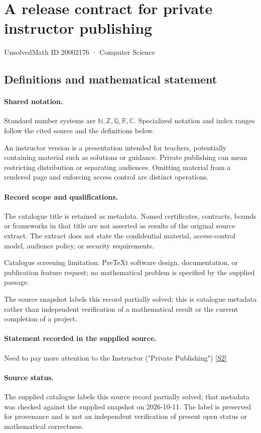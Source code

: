 \documentclass[11pt]{article}
\newcommand{\sref}[2]{\hyperlink{source:#1:#2}{[S#2]}}
\begin{document}
\setcounter{section}{20002175}
\section{A release contract for private instructor publishing}\label{20002176}
{\small\sffamily UnsolvedMath ID 20002176 · Computer Science}
\subsection{Definitions and mathematical statement}

\paragraph{Shared notation.}Standard number systems are $\mathbb N,\mathbb Z,\mathbb Q,\mathbb R,\mathbb C$. Specialized notation and index ranges follow the cited source and the definitions below.


An instructor version is a presentation intended for teachers, potentially containing material such as solutions or guidance. Private publishing can mean restricting distribution or separating audiences. Omitting material from a rendered page and enforcing access control are distinct operations.
\paragraph{Record scope and qualifications.}
The catalogue title is retained as metadata. Named certificates, contracts, bounds or frameworks in that title are not asserted as results of the original source extract.
The extract does not state the confidential material, access-control model, audience policy, or security requirements.

Catalogue screening limitation: PreTeXt software design, documentation, or publication feature request; no mathematical problem is specified by the supplied passage.

The source snapshot labels this record partially solved; this is catalogue metadata rather than independent verification of a mathematical result or the current completion of a project.
\paragraph{Statement recorded in the supplied source.}
Need to pay more attention to the Instructor ("Private Publishing") \sref{20002176}{2}
\paragraph{Source status.}
The supplied catalogue labels this source record partially solved; that metadata was checked against the supplied snapshot on 2026-10-11. The label is preserved for provenance and is not an independent verification of present open status or mathematical correctness.
\end{document}

